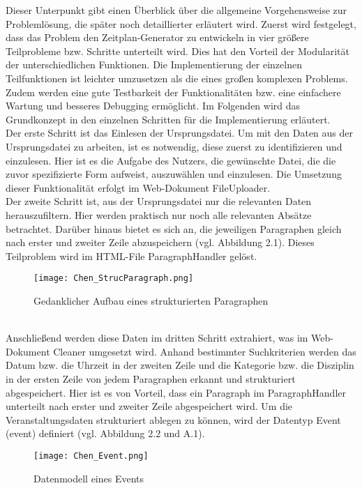 Dieser Unterpunkt gibt einen Überblick über die allgemeine Vorgehensweise zur Problemlösung, die später noch detaillierter erläutert wird. 
Zuerst wird festgelegt, dass das Problem den Zeitplan-Generator zu entwickeln in vier größere Teilprobleme bzw. Schritte unterteilt wird. Dies hat den Vorteil der Modularität der unterschiedlichen Funktionen. Die Implementierung der einzelnen Teilfunktionen ist leichter umzusetzen als die eines großen komplexen Problems. Zudem werden eine gute Testbarkeit der Funktionalitäten bzw. eine einfachere Wartung und besseres Debugging ermöglicht. Im Folgenden wird das Grundkonzept in den einzelnen Schritten für die Implementierung erläutert.\\
Der erste Schritt ist das Einlesen der Ursprungsdatei. Um mit den Daten aus der Ursprungsdatei zu arbeiten, ist es notwendig, diese zuerst zu identifizieren und einzulesen. Hier ist es die Aufgabe des Nutzers, die gewünschte Datei, die die zuvor spezifizierte Form aufweist, auszuwählen und einzulesen. Die Umsetzung dieser Funktionalität erfolgt im Web-Dokument FileUploader.\\ 
Der zweite Schritt ist, aus der Ursprungsdatei nur die relevanten Daten herauszufiltern. Hier werden praktisch nur noch alle relevanten Absätze betrachtet. Darüber hinaus bietet es sich an, die jeweiligen Paragraphen gleich nach erster und zweiter Zeile abzuspeichern (vgl. Abbildung 2.1). Dieses Teilproblem wird im HTML-File ParagraphHandler gelöst.
\begin{figure}[htbp]
  \centering
  \texttt{[image: Chen\_StrucParagraph.png]}
  \caption{Gedanklicher Aufbau eines strukturierten Paragraphen}
  \label{fig:Fig1}
\end{figure}\\
Anschließend werden diese Daten im dritten Schritt extrahiert, was im Web-Dokument Cleaner umgesetzt wird. Anhand bestimmter Suchkriterien werden das Datum bzw. die Uhrzeit in der zweiten Zeile und die Kategorie bzw. die Disziplin in der ersten Zeile von jedem Paragraphen erkannt und strukturiert abgespeichert. Hier ist es von Vorteil, dass ein Paragraph im ParagraphHandler unterteilt nach erster und zweiter Zeile abgespeichert wird. Um die Veranstaltungsdaten strukturiert ablegen zu können, wird der Datentyp Event (event) definiert (vgl. Abbildung 2.2 und A.1).\\
\begin{figure}[htbp]
  \centering
  \texttt{[image: Chen\_Event.png]}
  \caption{Datenmodell eines Events}
  \label{fig:Fig1}
\end{figure}\\
